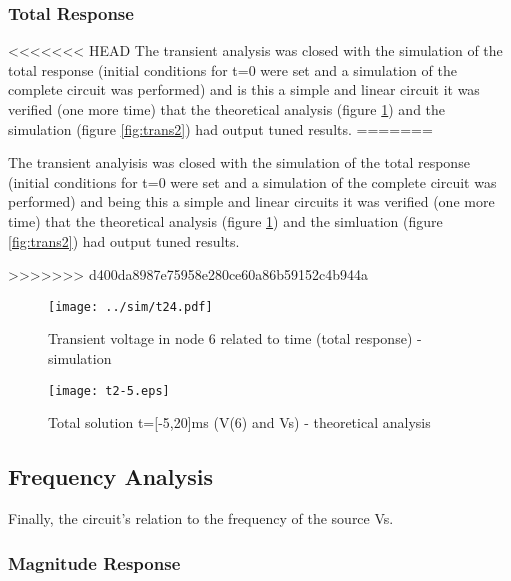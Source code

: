 \newpage
\subsubsection{Total Response}
<<<<<<< HEAD
The transient analysis was closed with the simulation of the total response (initial conditions for t=0 were set and a simulation of the complete circuit was performed) and is this a simple and linear circuit it was verified (one more time) that the theoretical analysis (figure \ref{fig:comptot}) and the simulation (figure \ref{fig:trans2}) had output tuned results.
=======


The transient analyisis was closed with the simulation of the total response (initial conditions for t=0 were set and a simulation of the complete circuit was performed) and being this a simple and linear circuits it was verified (one more time) that the theoretical analysis (figure \ref{fig:comptot}) and the simluation (figure \ref{fig:trans2}) had output tuned results.

>>>>>>> d400da8987e75958e280ce60a86b59152c4b944a

\begin{figure}[h] \centering
  \begin{minipage}{.5\textwidth}
    \texttt{[image: ../sim/t24.pdf]}
    \caption{Transient voltage in node 6 related to time (total response) - simulation}
    \label{fig:trans2}
    \end{minipage}%
  \begin{minipage}{.5\textwidth}
    \vspace{10mm}
  \centering
    \texttt{[image: t2-5.eps]}
    \caption{Total solution t=[-5,20]ms (V(6) and Vs) - theoretical analysis}
    \label{fig:comptot}
      \end{minipage}%
\end{figure}




\subsection{Frequency Analysis}

Finally, the circuit's relation to the frequency of the source Vs.

\subsubsection{Magnitude Response}

